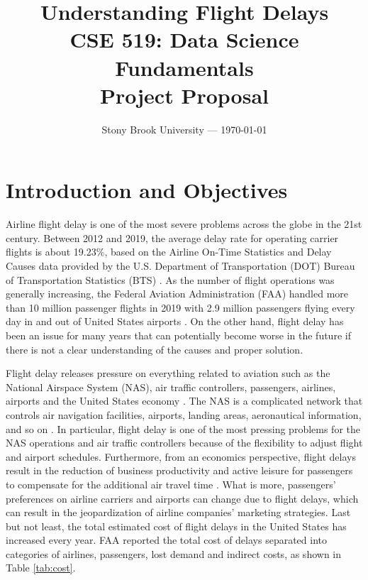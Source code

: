\documentclass[11pt, letterpaper]{article}
\title{\textbf{Understanding Flight Delays}\\\textbf{CSE 519: Data Science Fundamentals}\\\textbf{Project Proposal}}
\date{Stony Brook University --- \today}
\begin{document}
\maketitle

\section{Introduction and Objectives}
Airline flight delay is one of the most severe problems across the globe in the 21st century. Between 2012 and 2019, the average delay rate for operating carrier flights is about 19.23\%, based on the Airline On-Time Statistics and Delay Causes data provided by the U.S. Department of Transportation (DOT) Bureau of Transportation Statistics (BTS) \cite{web:bts}. As the number of flight operations was generally increasing, the Federal Aviation Administration (FAA) handled more than 10 million passenger flights in 2019 with 2.9 million passengers flying every day in and out of United States airports \cite{web:faa1}. On the other hand, flight delay has been an issue for many years that can potentially become worse in the future if there is not a clear understanding of the causes and proper solution.

Flight delay releases pressure on everything related to aviation such as the National Airspace System (NAS), air traffic controllers, passengers, airlines, airports and the United States economy \cite{ar:carvalho_et_al, web:faa2, ar:peterson_neels_barczi_graham}. The NAS is a complicated network that controls air navigation facilities, airports, landing areas, aeronautical information, and so on \cite{web:faa3}. In particular, flight delay is one of the most pressing problems for the NAS operations and air traffic controllers because of the flexibility to adjust flight and airport schedules. Furthermore, from an economics perspective, flight delays result in the reduction of business productivity and active leisure for passengers to compensate for the additional air travel time \cite{ar:peterson_neels_barczi_graham}. What is more, passengers' preferences on airline carriers and airports can change due to flight delays, which can result in the jeopardization of airline companies' marketing strategies. Last but not least, the total estimated cost of flight delays in the United States has increased every year. FAA \cite{web:faa2} reported the total cost of delays separated into categories of airlines, passengers, lost demand and indirect costs, as shown in Table \ref{tab:cost}. 
\end{document}
